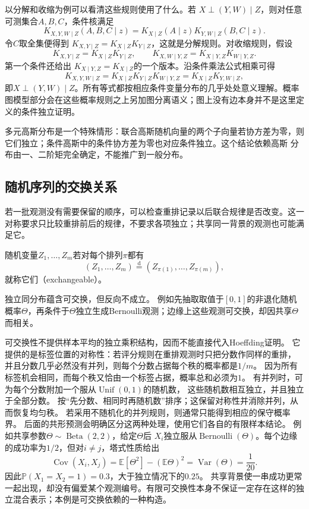 以分解和收缩为例可以看清这些规则使用了什么。若
\(X\perp(Y,W)\mid Z\)，则对任意可测集合\(A,B,C\)，条件核满足
\[
  K_{X,Y,W\mid Z}(A,B,C\mid z)
  =K_{X\mid Z}(A\mid z)K_{Y,W\mid Z}(B,C\mid z).
\]
令\(C\)取全集便得到
\(K_{X,Y\mid Z}=K_{X\mid Z}K_{Y\mid Z}\)，这就是分解规则。对收缩规则，假设
\[
  K_{X,Y\mid Z}=K_{X\mid Z}K_{Y\mid Z},
  \qquad
  K_{X,W\mid Y,Z}=K_{X\mid Y,Z}K_{W\mid Y,Z}.
\]
第一个条件还给出
\(K_{X\mid Y,Z}=K_{X\mid Z}\)的一个版本。沿条件乘法公式相乘可得
\[
  K_{X,Y,W\mid Z}
  =K_{X\mid Z}K_{Y\mid Z}K_{W\mid Y,Z}
  =K_{X\mid Z}K_{Y,W\mid Z},
\]
即\(X\perp(Y,W)\mid Z\)。所有等式都按相应条件变量分布的几乎处处意义理解。概率图模型部分会在这些概率规则之上另加图分离语义；图上没有边本身并不是这里定义的条件独立证明。

多元高斯分布是一个特殊情形：联合高斯随机向量的两个子向量若协方差为零，则它们独立；条件高斯中的条件协方差为零也对应条件独立。这个结论依赖高斯
分布由一、二阶矩完全确定，不能推广到一般分布。

\subsection{随机序列的交换关系}

若一批观测没有需要保留的顺序，可以检查重排记录以后联合规律是否改变。这一对称要求只比较重排前后的规律，不要求各项独立；共享同一背景的观测也可能满足它。
\label{sec:rv-exchangeability}
\begin{definition}[可交换随机变量]
  \label{def:probability-exchangeability}
随机变量\(Z_1,\ldots,Z_m\)若对每个排列\(\pi\)都有
\[ (Z_1,\ldots,Z_m)
  \overset{\mathrm{d}}{=}(Z_{\pi(1)},\ldots,Z_{\pi(m)}), \]
就称它们（exchangeable）。
\end{definition}
独立同分布蕴含可交换，但反向不成立。
例如先抽取取值于\([0,1]\)的非退化随机概率\(\Theta\)，再条件于\(\Theta\)独立生成Bernoulli观测；边缘上这些观测可交换，却因共享\(\Theta\)而相关。

可交换性不提供样本平均的独立乘积结构，因而不能直接代入Hoeffding证明。
它提供的是标签位置的对称性：若评分规则在重排观测时只把分数作同样的重排，
并且分数几乎必然没有并列，则每个分数占据每个秩的概率都是\(1/m\)。
因为所有标签机会相同，而每个秩又恰由一个标签占据，概率总和必须为\(1\)。
有并列时，可为每个分数附加一个服从\(\operatorname{Unif}(0,1)\)的随机数，
这些随机数相互独立，并且独立于全部分数。
按“先分数、相同时再随机数”排序；这保留对称性并消除并列，从而恢复均匀秩。
若采用不随机化的并列规则，则通常只能得到相应的保守概率界。
后面的共形预测会明确区分这两种处理，使用它们各自的有限样本结论。
例如共享参数\(\Theta\sim\operatorname{Beta}(2,2)\)，给定\(\Theta\)后
\(X_i\)独立服从\(\operatorname{Bernoulli}(\Theta)\)。每个边缘的成功率为\(1/2\)，但对\(i\ne j\)，塔式性质给出
\[
\operatorname{Cov}(X_i,X_j)
=\mathbb E[\Theta^2]-(\mathbb E\Theta)^2
=\operatorname{Var}(\Theta)=\frac1{20}.
\]
因此\(\mathbb P(X_1=X_2=1)=0.3\)，大于独立情况下的\(0.25\)。
共享背景使一串成功更常一起出现，却没有偏爱某个观测编号。有限可交换性本身不保证一定存在这样的独立混合表示；本例是可交换依赖的一种构造。

